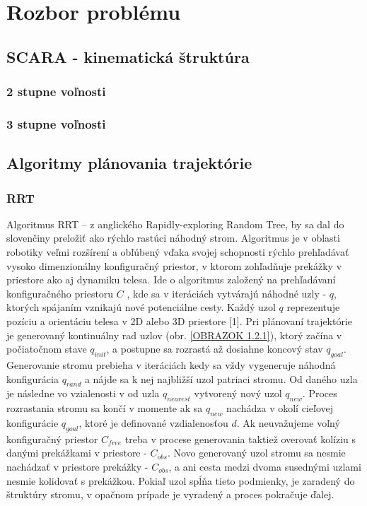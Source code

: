 
\section{Rozbor problému}
\label{kap:1}

\subsection{SCARA - kinematická štruktúra}
\label{kap:1.1}

\subsubsection{2 stupne voľnosti}
\label{kap:1.1.1}

\subsubsection{3 stupne voľnosti}
\label{kap:1.1.2}

\subsection{Algoritmy plánovania trajektórie}
\label{kap:1.2}
 
\subsubsection{RRT}
\label{kap:1.2.1}

Algoritmus RRT – z anglického Rapidly-exploring Random Tree, by sa dal do slovenčiny preložiť ako rýchlo rastúci náhodný strom. Algoritmus je v oblasti robotiky veľmi rozšírení a obľúbený vďaka svojej schopnosti rýchlo prehľadávať vysoko dimenzionálny konfiguračný priestor, v ktorom zohľadňuje prekážky v priestore ako aj dynamiku telesa. \newline
Ide o algoritmus založený na prehľadávaní konfiguračného priestoru $C$ , kde sa v iteráciách vytvárajú náhodné uzly - $q$, ktorých spájaním vznikajú nové potenciálne cesty. Každý uzol $q$ reprezentuje pozíciu a orientáciu telesa v 2D alebo 3D priestore [1]. Pri plánovaní trajektórie je generovaný kontinuálny rad uzlov (obr. \ref{OBRAZOK 1.2.1}), ktorý začína v počiatočnom stave $q_{init}$,  a postupne sa rozrastá až dosiahne koncový stav $q_{goal}$.  Generovanie stromu prebieha v iteráciách kedy sa vždy vygeneruje náhodná konfigurácia $q_{rand}$ a nájde sa k nej najbližší uzol patriaci stromu. Od daného uzla je následne vo vzialenosti v od uzla $q_{nearest}$ vytvorený nový uzol $q_{new}$. Proces rozrastania stromu sa končí v momente ak sa $q_{new}$  nachádza v okolí cieľovej konfigurácie $q_{goal}$, ktoré je definované vzdialenosťou $d$. Ak neuvažujeme voľný konfiguračný priestor $C_{free}$ treba v procese generovania taktiež overovať kolíziu s danými prekážkami v priestore - $C_{obs}$. Novo generovaný uzol stromu sa nesmie nachádzať v priestore prekážky - $C_{obs}$, a ani cesta medzi dvoma susednými uzlami nesmie kolidovať s prekážkou. Pokiaľ uzol spĺňa tieto podmienky, je zaradený do štruktúry stromu, v opačnom prípade je vyradený a proces pokračuje ďalej.

